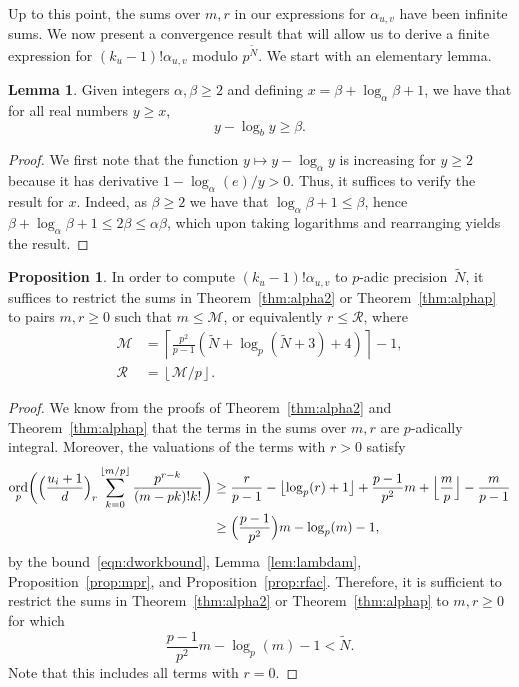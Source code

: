 \documentclass[a4paper,11pt]{article}
\numberwithin{equation}{section}
\providecommand{\floor}[1]{\left\lfloor#1\right\rfloor}   %
\providecommand{\floorBig}[1]{\Bigl\lfloor#1\Bigr\rfloor} %
\providecommand{\ceil}[1]{\left\lceil#1\right\rceil}   %
\DeclareMathOperator{\ord}{ord}          %
\theoremstyle{definition}
\newtheorem{lem}[thm]{Lemma}
\newtheorem{prop}[thm]{Proposition}
\begin{document}
Up to this point, the sums over $m,r$ in our expressions 
for $\alpha_{u,v}$ have been infinite sums.  We now present 
a convergence result that will allow us to derive a finite 
expression for $(k_u-1)!\alpha_{u,v}$ modulo $p^{\tilde{N}}$.
We start with an elementary lemma.

\begin{lem} \label{lem:log}
Given integers $\alpha, \beta \geq 2$ and defining 
$x = \beta + \log_{\alpha} \beta + 1$, we have that 
for all real numbers $y \geq x$, 
\begin{equation*}
y - \log_b y \geq \beta.
\end{equation*}
\end{lem}

\begin{proof}
We first note that the function $y \mapsto y - \log_{\alpha} y$ is increasing 
for $y \geq 2$ because it has derivative $1 - \log_{\alpha}(e)/y > 0$.  Thus, 
it suffices to verify the result for $x$.  Indeed, as $\beta \geq 2$ we have 
that $\log_{\alpha} \beta + 1 \leq \beta$, hence 
$\beta + \log_{\alpha} \beta + 1 \leq 2 \beta \leq \alpha \beta$,
which upon taking logarithms and rearranging yields the result.
\end{proof}


\begin{prop} \label{prop:MR}
In order to compute $(k_u-1)!\alpha_{u,v}$ to $p$-adic precision~$\tilde{N}$, 
it suffices to restrict the sums in Theorem~\ref{thm:alpha2} or 
Theorem~\ref{thm:alphap} to pairs $m,r \geq 0$ such that $m \leq \mathcal{M}$, 
or equivalently $r \leq \mathcal{R}$, where 
\begin{align*}
\mathcal{M} &= \ceil{\frac{p^2}{p-1}(\tilde{N}+\log_p(\tilde{N}+3)+4)} - 1, \\
\mathcal{R} &= \floor{\mathcal{M}/p}.
\end{align*}
\end{prop}

\begin{proof}
We know from the proofs of Theorem~\ref{thm:alpha2} and 
Theorem~\ref{thm:alphap} that the terms in the sums over $m,r$ are 
$p$-adically integral. Moreover, the valuations of the terms with 
$r > 0$ satisfy
\begin{align*}
\ord_p \biggl( \Bigl( \frac{u_i+1}{d} \Bigr)_r 
               \sum_{k=0}^{\floor{m/p}} \frac{p^{r-k}}{(m-pk)!k!} \biggr) 
&\geq \frac{r}{p-1} - \floor{\log_p(r)+1} 
      + \frac{p-1}{p^2} m + \floorBig{\frac{m}{p}} - \frac{m}{p-1} \\
&\geq \Bigl( \frac{p-1}{p^2} \Bigr) m - \log_p(m) - 1,
\end{align*}
by the bound~\eqref{eqn:dworkbound}, Lemma~\ref{lem:lambdam}, 
Proposition~\ref{prop:mpr}, and Proposition~\ref{prop:rfac}. 
Therefore, it is sufficient to restrict the sums in Theorem~\ref{thm:alpha2} 
or Theorem~\ref{thm:alphap} to $m,r \geq 0$ for which 
\begin{equation*}
\frac{p-1}{p^2} m - \log_p(m) - 1 < \tilde{N}.
\end{equation*}
Note that this includes all terms with $r = 0$.
\end{proof}
\end{document}

